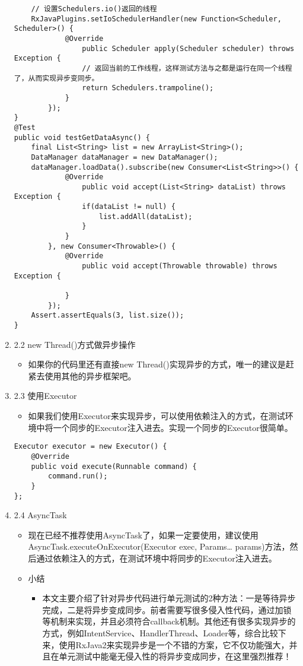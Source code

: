 \documentclass[9pt, b5paper]{article}
\begin{document}
\begin{enumerate}
\begin{verbatim}
    // 设置Schedulers.io()返回的线程
    RxJavaPlugins.setIoSchedulerHandler(new Function<Scheduler, Scheduler>() {
            @Override
                public Scheduler apply(Scheduler scheduler) throws Exception {
                // 返回当前的工作线程，这样测试方法与之都是运行在同一个线程了，从而实现异步变同步。
                return Schedulers.trampoline();
            }
        });
}
@Test
public void testGetDataAsync() {    
    final List<String> list = new ArrayList<String>();
    DataManager dataManager = new DataManager();
    dataManager.loadData().subscribe(new Consumer<List<String>>() {
            @Override
                public void accept(List<String> dataList) throws Exception {
                if(dataList != null) {
                    list.addAll(dataList);
                }
            }
        }, new Consumer<Throwable>() {
            @Override
                public void accept(Throwable throwable) throws Exception {

            }
        });
    Assert.assertEquals(3, list.size());
}
\end{verbatim}
\item 2.2 new Thread()方式做异步操作
\label{sec-1-3-2-2}
\begin{itemize}
\item 如果你的代码里还有直接new Thread()实现异步的方式，唯一的建议是赶紧去使用其他的异步框架吧。
\end{itemize}
\item 2.3 使用Executor
\label{sec-1-3-2-3}
\begin{itemize}
\item 如果我们使用Executor来实现异步，可以使用依赖注入的方式，在测试环境中将一个同步的Executor注入进去。实现一个同步的Executor很简单。
\end{itemize}
\begin{verbatim}
Executor executor = new Executor() {
    @Override
    public void execute(Runnable command) {
        command.run();
    }
};
\end{verbatim}
\item 2.4 AsyncTask
\label{sec-1-3-2-4}
\begin{itemize}
\item 现在已经不推荐使用AsyncTask了，如果一定要使用，建议使用AsyncTask.executeOnExecutor(Executor exec, Params\ldots{} params)方法，然后通过依赖注入的方式，在测试环境中将同步的Executor注入进去。
\item 小结
\begin{itemize}
\item 本文主要介绍了针对异步代码进行单元测试的2种方法：一是等待异步完成，二是将异步变成同步。前者需要写很多侵入性代码，通过加锁等机制来实现，并且必须符合callback机制。其他还有很多实现异步的方式，例如IntentService、HandlerThread、Loader等，综合比较下来，使用RxJava2来实现异步是一个不错的方案，它不仅功能强大，并且在单元测试中能毫无侵入性的将异步变成同步，在这里强烈推荐！
\end{itemize}
\end{itemize}
\end{enumerate}
\end{document}
